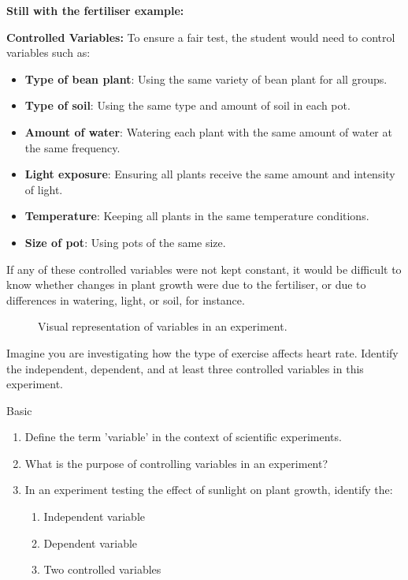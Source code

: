 \begin{example}
\textbf{Still with the fertiliser example:}

\textbf{Controlled Variables:}  To ensure a fair test, the student would need to control variables such as:
\begin{itemize}
    \item \textbf{Type of bean plant}:  Using the same variety of bean plant for all groups.
    \item \textbf{Type of soil}:  Using the same type and amount of soil in each pot.
    \item \textbf{Amount of water}:  Watering each plant with the same amount of water at the same frequency.
    \item \textbf{Light exposure}:  Ensuring all plants receive the same amount and intensity of light.
    \item \textbf{Temperature}:  Keeping all plants in the same temperature conditions.
    \item \textbf{Size of pot}: Using pots of the same size.
\end{itemize}
If any of these controlled variables were not kept constant, it would be difficult to know whether changes in plant growth were due to the fertiliser, or due to differences in watering, light, or soil, for instance.
\end{example}

\begin{figure}
\centering
{}
\caption{Visual representation of variables in an experiment.}
\end{figure}

\begin{stopandthink}
Imagine you are investigating how the type of exercise affects heart rate. Identify the independent, dependent, and at least three controlled variables in this experiment.
\end{stopandthink}

\begin{tieredquestions}{Basic}
\begin{enumerate}
    \item Define the term 'variable' in the context of scientific experiments.
    \item What is the purpose of controlling variables in an experiment?
    \item In an experiment testing the effect of sunlight on plant growth, identify the:
    \begin{enumerate}
        \item Independent variable
        \item Dependent variable
        \item Two controlled variables
    \end{enumerate}
\end{enumerate}
\end{tieredquestions}

